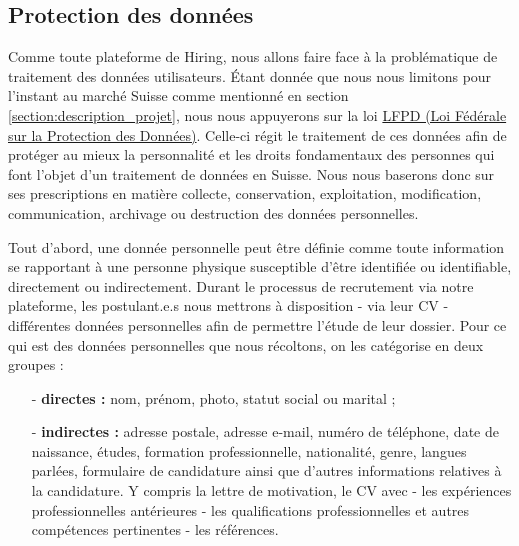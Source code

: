

\subsection{Protection des données}\label{subsection:protection_des_donnees}

 Comme toute plateforme de Hiring, nous allons faire face à la problématique de traitement des données utilisateurs. Étant donnée que nous nous limitons pour l'instant au marché Suisse comme mentionné en section \ref{section:description_projet}, nous nous appuyerons sur la loi \href{https://www.fedlex.admin.ch/eli/cc/1993/1945_1945_1945/fr}{LFPD (Loi Fédérale
sur la Protection des Données)}. Celle-ci régit le traitement de ces données afin de protéger au mieux la personnalité et les droits fondamentaux des personnes qui font l’objet d’un traitement de données en Suisse. \newline 
Nous nous baserons donc sur ses prescriptions en matière collecte, conservation, exploitation, modification,  communication, archivage ou destruction des données personnelles.\newline

Tout d'abord, une donnée personnelle peut être définie comme toute information se rapportant à une personne physique susceptible d'être identifiée ou identifiable, directement ou indirectement.  Durant le processus de recrutement via notre plateforme, les postulant.e.s nous mettrons à disposition - via leur CV - différentes données personnelles afin de permettre l'étude de leur dossier. Pour ce qui est des données personnelles que nous récoltons, on les catégorise en deux groupes :\newline

\begin{enumerate}
\item[-] \textbf{directes :} nom, prénom, photo, statut social ou marital ; \\
\item[-] \textbf{indirectes :} adresse postale, adresse e-mail, numéro de téléphone, date de naissance, études, formation professionnelle, nationalité, genre, langues parlées, formulaire de candidature ainsi que d'autres informations relatives à la candidature. Y compris la lettre de motivation, le CV avec - les expériences professionnelles antérieures - les qualifications professionnelles et autres compétences pertinentes - les références.\\
\end{enumerate}

